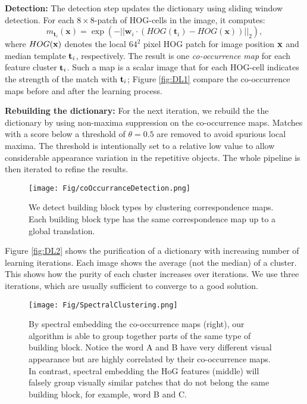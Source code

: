\documentclass{acmtog}
\begin{document}
\textbf{Detection:} The detection step updates the dictionary using sliding window detection. For each $8\times 8$-patch of HOG-cells in the image, it computes:
%
\begin{equation}
m_{\textbf{t}_i}(\textbf{x}) = \exp\left(-||\textbf{w}_i\cdot(HOG(\textbf{t}_i) - HOG(\textbf{x}))||_2 \right),
\label{eq:finalMatching}
\end{equation}
%
where $HOG(\mathbf{x})$ denotes the local $64^2$ pixel HOG patch for image position $\mathbf{x}$ and median template $\mathbf{t}_i$, respectively. The result is one \emph{co-occurrence map} for each feature cluster $\mathbf{t}_i$. Such a map is a scalar image that for each HOG-cell indicates the strength of the match with $\mathbf{t}_i$; Figure \ref{fig:DL1} compare the co-occurrence maps before and after the learning process.

\textbf{Rebuilding the dictionary:} For the next iteration, we rebuild the the dictionary by using non-maxima suppression on the co-occurrence maps.  Matches with a score below a threshold of $\theta = 0.5$ are removed to avoid spurious local maxima. The threshold is intentionally set to a relative low value to allow considerable appearance variation in the repetitive objects. The whole pipeline is then iterated to refine the results. 

\begin{figure}
	\centering
		\texttt{[image: Fig/coOccurranceDetection.png]}
	\caption{We detect building block types by clustering correspondence maps. Each building block type has the same correspondence map up to a global translation.}
	\label{fig:coOccurranceDetection}
\end{figure}

Figure \ref{fig:DL2} shows the purification of a dictionary with increasing number of learning iterations. Each image shows the average (not the median) of a cluster. This shows how the purity of each cluster increases over iterations. We use three iterations, which are usually sufficient to converge to a good solution.

\begin{figure*}[t!]
  \centering
  \texttt{[image: Fig/SpectralClustering.png]}
  \caption{By spectral embedding the co-occurrence maps (right), our algorithm is able to group together parts of the same type of building block. Notice the word A and B have very different visual appearance but are highly correlated by their co-occurrence maps. In contrast, spectral embedding the HoG features (middle) will falsely group visually similar patches that do not belong the same building block, for example, word B and C.} 
	\label{fig:SpectralClustering}
\end{figure*}
\end{document}
